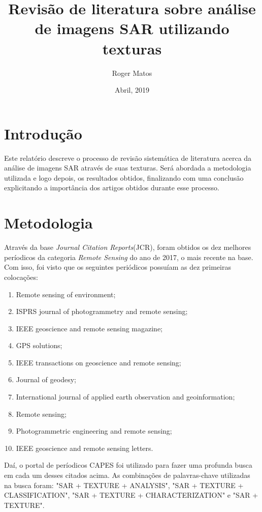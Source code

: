 \documentclass[12pt]{article}
\title{Revisão de literatura sobre análise de imagens SAR utilizando texturas}
\author{Roger Matos\inst{1}}
\date{Abril, 2019}
\begin{document}
\maketitle

\section{Introdução}

Este relatório descreve o processo de revisão sistemática de literatura acerca da análise de imagens SAR através de suas texturas. Será abordada a metodologia utilizada e logo depois, os resultados obtidos, finalizando com uma conclusão explicitando a importância dos artigos obtidos durante esse processo.

\section{Metodologia}

Através da base \textit{Journal Citation Reports}(JCR), foram obtidos os dez melhores períodicos da categoria \textit{Remote Sensing} do ano de 2017, o mais recente na base. Com isso, foi visto que os seguintes periódicos possuíam as dez primeiras colocações:

\begin{enumerate}
    \item Remote sensing of environment;
    \item ISPRS journal of photogrammetry and remote sensing;
    \item IEEE geoscience and remote sensing magazine;
    \item GPS solutions;
    \item IEEE transactions on geoscience and remote sensing;
    \item Journal of geodesy;
    \item International journal of applied earth observation and geoinformation;
    \item Remote sensing;
    \item Photogrammetric engineering and remote sensing;
    \item IEEE geoscience and remote sensing letters.
\end{enumerate}

Daí, o portal de períodicos CAPES foi utilizado para fazer uma profunda busca em cada um desses citados acima. As combinações de palavras-chave utilizadas na busca foram: "SAR + TEXTURE + ANALYSIS", "SAR + TEXTURE + CLASSIFICATION", "SAR + TEXTURE + CHARACTERIZATION" e "SAR + TEXTURE".
\end{document}
